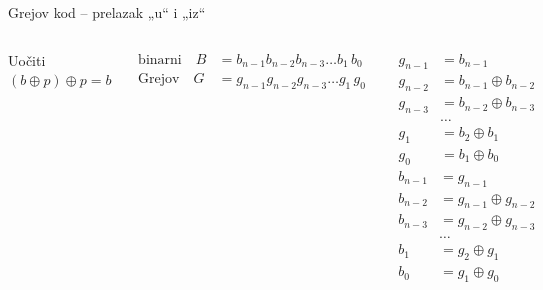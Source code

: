 \begin{frame}[label=06-s021]{Grejov kod – prelazak „u“ i „iz“}
\fontsize{10}{12}\selectfont\setlength{\abovedisplayskip}{3pt}\setlength{\belowdisplayskip}{3pt}
\begin{columns}[c,onlytextwidth]
\centering Uočiti\quad $(b\oplus p)\oplus p=b$\par\vspace{3mm}
\renewcommand{\arraystretch}{1.2}
\begin{align*}
\text{binarni}\quad B&=b_{n-1}b_{n-2}b_{n-3}\ldots b_1\,b_0\\
\text{Grejov}\quad G&=g_{n-1}g_{n-2}g_{n-3}\ldots g_1\,g_0
\end{align*}
\begin{columns}[T,onlytextwidth]
\begin{align*}
g_{n-1}&=b_{n-1}\\g_{n-2}&=b_{n-1}\oplus b_{n-2}\\g_{n-3}&=b_{n-2}\oplus b_{n-3}\\&\ldots\\g_1&=b_2\oplus b_1\\g_0&=b_1\oplus b_0
\end{align*}
\begin{align*}
b_{n-1}&=g_{n-1}\\b_{n-2}&=g_{n-1}\oplus g_{n-2}\\b_{n-3}&=g_{n-2}\oplus g_{n-3}\\&\ldots\\b_1&=g_2\oplus g_1\\b_0&=g_1\oplus g_0
\end{align*}\end{columns}\end{columns}
\end{frame}
